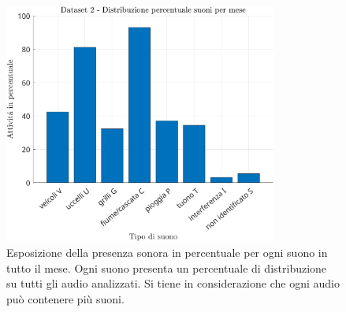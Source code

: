 \begin{center}
\begin{figure}[htp]
	\centering
	\includegraphics[width=0.8\textwidth]{img/cap3-dataset2.jpg}
	\caption{Esposizione della presenza sonora in percentuale per ogni suono in tutto il mese. Ogni suono
		presenta un percentuale di distribuzione su tutti gli audio analizzati. Si tiene in considerazione che ogni audio può contenere più suoni.}
	\label{fig3.2}
\end{figure}
\end{center}